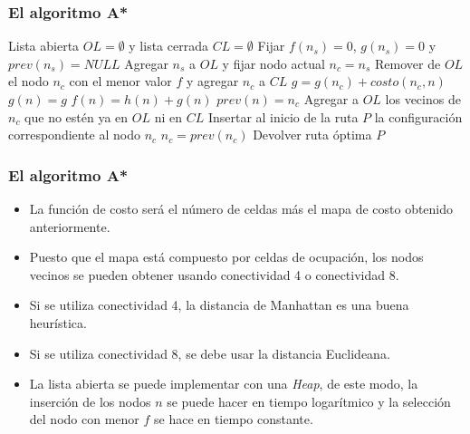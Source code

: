 \begin{frame}\frametitle{El algoritmo A*}
    \begin{algorithm}[H]
    \footnotesize
    \DontPrintSemicolon
    Lista abierta $OL = \emptyset$ y lista cerrada $CL = \emptyset$\;
    Fijar $f(n_{s}) = 0$, $g(n_{s}) = 0$ y $prev(n_{s}) = NULL$\;
    Agregar $n_s$ a $OL$ y fijar nodo actual $n_c = n_s$\;
    {
      Remover de $OL$ el nodo $n_c$ con el menor valor $f$ y agregar $n_c$ a $CL$\;
      {
        $g = g(n_c) + costo(n_c, n)$\;
        {
          $g(n) = g$\;
          $f(n) = h(n) + g(n)$\;
          $prev(n) = n_c$\;
        }
      }
      Agregar a $OL$ los vecinos de $n_c$ que no estén ya en $OL$ ni en $CL$\;
    }
    {
      Insertar al inicio de la ruta $P$ la configuración correspondiente al nodo $n_c$\;
      $n_c = prev(n_c)$
    }
    Devolver ruta óptima $P$
  \end{algorithm}
\end{frame}

\begin{frame}\frametitle{El algoritmo A*}
  \begin{itemize}
  \item La función de costo será el número de celdas más el mapa de costo obtenido anteriormente.
  \item Puesto que el mapa está compuesto por celdas de ocupación, los nodos vecinos se pueden obtener usando conectividad 4 o conectividad 8.
  \item Si se utiliza conectividad 4, la distancia de Manhattan es una buena heurística.
  \item Si se utiliza conectividad 8, se debe usar la distancia Euclideana.
  \item La lista abierta se puede implementar con una \textit{Heap}, de este modo, la inserción de los nodos $n$ se puede hacer en tiempo logarítmico y la selección del nodo con menor $f$ se hace en tiempo constante.
  \end{itemize}
\end{frame}

